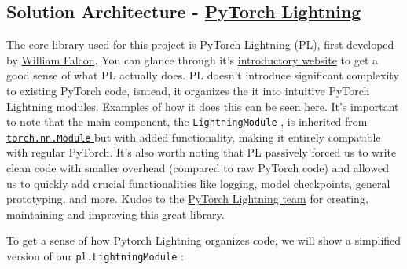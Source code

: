 \documentclass[]{article}
\let\oldtexttt\texttt
\renewcommand{\texttt}[1]{
  \textcolor{tcolor}{\colorbox{bgcolor}{\oldtexttt{#1}}}
}
\begin{document}
\hypertarget{solution-architecture---pytorch-lightning}{%
\subsection{\texorpdfstring{Solution Architecture -
\href{https://pytorch-lightning.readthedocs.io/en/latest/starter/introduction.html}{PyTorch
Lightning}}{Solution Architecture - PyTorch Lightning}}\label{solution-architecture---pytorch-lightning}}

The core library used for this project is PyTorch Lightning (PL), first
developed by \href{https://www.williamfalcon.com/}{William Falcon}. You
can glance through it's
\href{https://pytorch-lightning.readthedocs.io/en/stable/starter/introduction.html}{introductory
website} to get a good sense of what PL actually does. PL doesn't
introduce significant complexity to existing PyTorch code, isntead, it
organizes the it into intuitive PyTorch Lightning modules. Examples of
how it does this can be seen
\href{https://pytorch-lightning.readthedocs.io/en/latest/starter/converting.html}{here}.
It's important to note that the main component, the
\href{https://pytorch-lightning.readthedocs.io/en/stable/common/lightning_module.html}{\texttt{LightningModule}},
is inherited from
\href{https://pytorch.org/docs/stable/generated/torch.nn.Module.html}{\texttt{torch.nn.Module}}
but with added functionality, making it entirely compatible with regular
PyTorch. It's also worth noting that PL passively forced us to write
clean code with smaller overhead (compared to raw PyTorch code) and
allowed us to quickly add crucial functionalities like logging, model
checkpoints, general prototyping, and more. Kudos to the
\href{https://www.pytorchlightning.ai/team}{PyTorch Lightning team} for
creating, maintaining and improving this great library.

To get a sense of how Pytorch Lightning organizes code, we will show a
simplified version of our \texttt{pl.LightningModule}:
\end{document}

